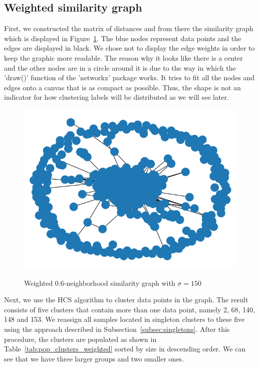 \documentclass[paper=a4,fontsize=11pt,DIV=8,BCOR=5mm,twoside,pdftex,bibtotocnumbered]{scrreprt}
\theoremstyle{plain}
\begin{document}
\subsection{Weighted similarity graph}
 First, we constructed the matrix of distances and from there the similarity graph which is displayed in Figure~\ref{fig:weighted_sim_graph}. The blue nodes represent data points and the edges are displayed in black. We chose not to display the edge weights in order to keep the graphic more readable. The reason why it looks like there is a center and the other nodes are in a circle around it is due to the way in which the 'draw()' function of the 'networkx' package works. It tries to fit all the nodes and edges onto a canvas that is as compact as possible. Thus, the shape is not an indicator for how clustering labels will be distributed as we will see later.
 
 \begin{figure}
 	\centering
 	\caption{Weighted $0.6$-neighborhood similarity graph with $\sigma=150$}
 	\includegraphics[scale=0.5]{G_weighted.png}
 	\label{fig:weighted_sim_graph}
 \end{figure}
 
 Next, we use the HCS algorithm to cluster data points in the graph. The result consists of five clusters that contain more than one data point, namely 2, 68, 140, 148 and 153. We reassign all samples located in singleton clusters to these five using the approach described in Subsection~\ref{subsec:singletons}. After this procedure, the clusters are populated as shown in Table~\ref{tab:pop_clusters_weighted} sorted by size in descending order. We can see that we have three larger groups and two smaller ones. 
\end{document}
